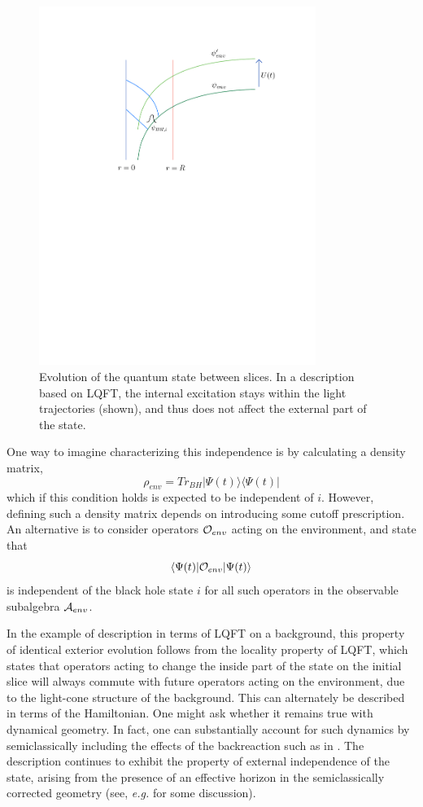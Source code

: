 \documentclass[12pt]{article}
\numberwithin{equation}{section}
\newcommand{\calo}{{\cal O}}
\newcommand{\cala}{{\cal A}}
\newcommand{\beq}{\begin{equation}}
\newcommand{\eeq}{\end{equation}}
\begin{document}
\begin{figure}[!hbtp] \begin{center}
\includegraphics[width=9cm]{Fig-slices.pdf}
\end{center}
\caption{Evolution of the quantum state between slices.  In a description based on LQFT, the internal excitation stays within the light trajectories (shown), and thus does not affect the external part of the state.}
\label{Figslices}
\end{figure} 


One way to imagine characterizing this independence is by calculating a density matrix,
\beq
\rho_{env} = Tr_{BH}|\Psi(t)\rangle\langle\Psi(t)|
\eeq
which if this condition holds is expected to be independent of $i$.  However, defining such a density matrix depends on introducing some cutoff prescription.  An alternative is to consider operators $\calo_{env}$ acting on the environment, and state that
\beq
\langle\Psi(t)|{\cal O}_{env}|\Psi(t)\rangle
\eeq
is independent of the black hole state $i$ for all such operators in the observable subalgebra $\cala_{env}$.  

In the example of description in terms of  LQFT on a background, this property of identical exterior evolution follows from the locality property of LQFT, which states that operators acting to change the inside part of the state on the initial slice will always commute with  future operators acting on the environment, due to the light-cone structure of the background.  This can alternately be described in terms of the Hamiltonian.  One might ask whether it remains true with dynamical geometry.  In fact, one can substantially account for such dynamics by semiclassically including the effects of the backreaction such as in \cite{CGHS}.  The description continues to exhibit the property of external independence of the state, arising from the presence of an effective horizon in the semiclassically corrected geometry (see, {\it e.g.} \cite{GiNe} for some discussion).
\end{document}
